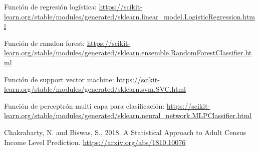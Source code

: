 \documentclass[11pt,a4paper]{article}
\begin{document}
\begin{thebibliography}{9}
Función de regresión logística:
\url{https://scikit-learn.org/stable/modules/generated/sklearn.linear_model.LogisticRegression.html}

Función de ramdon forest:
\url{https://scikit-learn.org/stable/modules/generated/sklearn.ensemble.RandomForestClassifier.html}

Función de support vector machine:
\url{https://scikit-learn.org/stable/modules/generated/sklearn.svm.SVC.html}

Función de perceptrón multi capa para clasificación:
\url{https://scikit-learn.org/stable/modules/generated/sklearn.neural_network.MLPClassifier.html}

Chakrabarty, N. and Biswas, S., 2018. A Statistical Approach to Adult Census Income Level Prediction.
\url{https://arxiv.org/abs/1810.10076}

\end{thebibliography}
\end{document}
